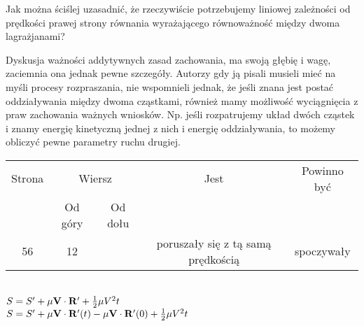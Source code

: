 \documentclass[a4paper,11pt]{article}
\numberwithin{equation}{section}
\begin{document}
\VerSpaceFour





\noindent
{} Jak można ściślej uzasadnić, że rzeczywiście
potrzebujemy liniowej zależności od prędkości prawej strony równania
wyrażającego równoważność między dwoma lagrażjanami? \Dok

\VerSpaceFour




\noindent
{} Dyskusja ważności addytywnych zasad zachowania, ma
swoją głębię i wagę, zaciemnia ona jednak pewne szczegóły. Autorzy gdy
ją pisali musieli mieć na myśli procesy rozpraszania, nie wspomnieli
jednak, że jeśli znana jest postać oddziaływania między dwoma
cząstkami, również mamy możliwość wyciągnięcia z praw zachowania
ważnych wniosków. Np. jeśli rozpatrujemy układ dwóch cząstek i znamy
energię kinetyczną jednej z nich i energię oddziaływania, to możemy
obliczyć pewne parametry ruchu drugiej.

\VerSpaceFour










\newpage



\begin{center}

  \begin{tabular}{|c|c|c|c|c|}
    \hline
    Strona & \multicolumn{2}{c|}{Wiersz} & Jest
                              & Powinno być \\ \cline{2-3}
    & Od góry & Od dołu & & \\
    \hline
    56  & 12 & & poruszały się z tą samą prędkością & spoczywały \\
    \hline
  \end{tabular}

\end{center}

\VerSpaceTwo


\noindent
{} \\
\Jest $S = S' + \mu \mathbf{V} \cdot \mathbf{R}' + \frac{ 1 }{ 2 } \mu V^{ 2 } t$ \\
\PowinnoByc $S = S' + \mu \mathbf{V} \cdot \mathbf{R}'( t ) - \mu \mathbf{V}
\cdot \mathbf{R}'( 0 ) + \frac{ 1 }{ 2 } \mu V^{ 2 } t$ \\
\end{document}
